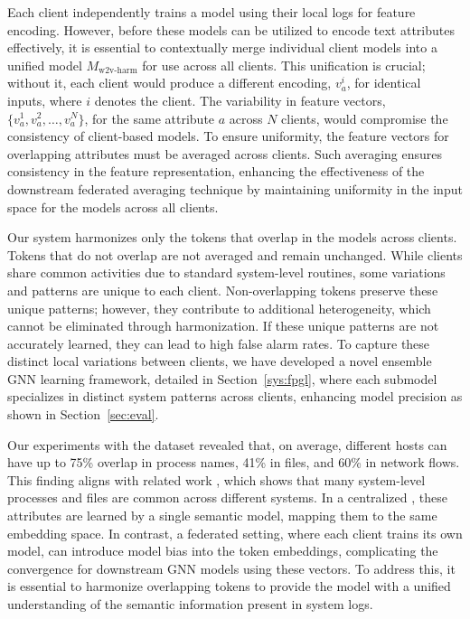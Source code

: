  Each client independently trains a \wordvec model using their local logs for feature encoding. However, before these models can be utilized to encode text attributes effectively, it is essential to contextually merge individual client \wordvec models into a unified model \( M_{\text{w2v-harm}} \) for use across all clients. This unification is crucial; without it, each client would produce a different encoding, \(v_a^i\), for identical inputs, where \(i\) denotes the client. The variability in feature vectors, \(\{v_a^1, v_a^2, \ldots, v_a^N\}\), for the same attribute \(a\) across \(N\) clients, would compromise the consistency of client-based \gnnshort models. To ensure uniformity, the feature vectors for overlapping attributes must be averaged across clients. Such averaging ensures consistency in the feature representation, enhancing the effectiveness of the downstream federated averaging technique by maintaining uniformity in the input space for the \gnnshort models across all clients.

Our system harmonizes only the tokens that overlap in the \wordvec models across clients. Tokens that do not overlap are not averaged and remain unchanged. While clients share common activities due to standard system-level routines, some variations and patterns are unique to each client. Non-overlapping tokens preserve these unique patterns; however, they contribute to additional heterogeneity, which cannot be eliminated through harmonization. If these unique patterns are not accurately learned, they can lead to high false alarm rates. To capture these distinct local variations between clients, we have developed a novel ensemble GNN learning framework, detailed in Section~\ref{sys:fpgl}, where each submodel specializes in distinct system patterns across clients, enhancing model precision as shown in Section~\ref{sec:eval}.

 Our experiments with the \optc dataset revealed that, on average, different hosts can have up to 75\% overlap in process names, 41\% in files, and 60\% in network flows. This finding aligns with related work \cite{flash2024}, which shows that many system-level processes and files are common across different systems. In a centralized \pids, these attributes are learned by a single semantic model, mapping them to the same embedding space. In contrast, a federated setting, where each client trains its own model, can introduce model bias into the token embeddings, complicating the convergence for downstream GNN models using these vectors. To address this, it is essential to harmonize overlapping tokens to provide the model with a unified understanding of the semantic information present in system logs.

